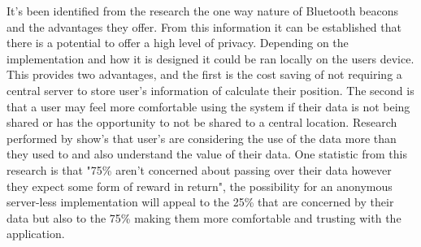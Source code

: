 It's been identified from the research the one way nature of Bluetooth beacons and the advantages they offer. From this information it can be established that there is a potential to offer a high level of privacy. Depending on the implementation and how it is designed it could be ran locally on the users device. This provides two advantages, and the first is the cost saving of not requiring a central server to store user's information of calculate their position. The second is that a user may feel more comfortable using the system if their data is not being shared or has the opportunity to not be shared to a central location. Research performed by \cite{axel_2018_how} show's that user's are considering the use of the data more than they used to and also understand the value of their data. One statistic from this research is that "75\% aren't concerned about passing over their data however they expect some form of reward in return", the possibility for an anonymous server-less implementation will appeal to the 25\% that are concerned by their data but also to the 75\% making them more comfortable and trusting with the application.


